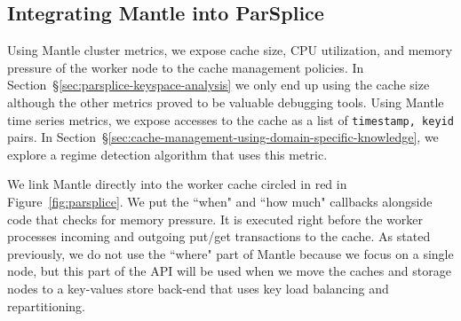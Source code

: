 \subsection{Integrating Mantle into ParSplice}

Using Mantle cluster metrics, we expose cache size, CPU utilization, and memory
pressure of the worker node to the cache management policies. In
Section~\S\ref{sec:parsplice-keyspace-analysis} we only end up using the cache
size although the other metrics proved to be valuable debugging tools. Using
Mantle time series metrics, we expose accesses to the cache as a list of
\texttt{timestamp, keyid} pairs. In
Section~\S\ref{sec:cache-management-using-domain-specific-knowledge}, we
explore a regime detection algorithm that uses this metric.

We link Mantle directly into the worker cache circled in red in
Figure~\ref{fig:parsplice}. We put the ``when" and ``how much" callbacks
alongside code that checks for memory pressure. It is executed right before the
worker processes incoming and outgoing put/get transactions to the cache. As
stated previously, we do not use the ``where" part of Mantle because we focus
on a single node, but this part of the API will be used when we move the caches
and storage nodes to a key-values store back-end that uses key load balancing and
repartitioning.
